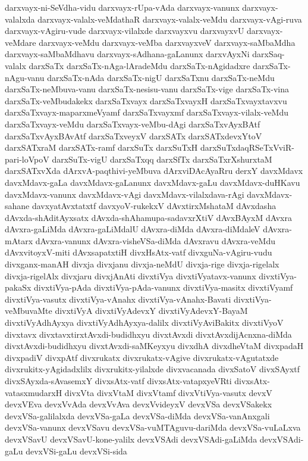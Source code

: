 {darxvayx-ni-SeVdha-vidu
darxvayx-rUpa-vAda
darxvayx-vanunx
darxvayx-valalxda
darxvayx-valalx-veMdathaR
darxvayx-valalx-veMdu
darxvayx-vAgi-ruva
darxvayx-vAgiru-vude
darxvayx-vilalxde
darxvayxvu
darxvayxvU
darxvayx-veMdare
darxvayx-veMdu
darxvayx-veMba
darxvayxveV
darxvayx-saMbaMdha
darxvayx-saMbaMdhavu
darxvayx-sAdhana-gaLanunx
darxvAyxNi
darxSaq-valalx
darxSaTx
darxSaTx-nAga-lAradeMdu
darxSaTx-nAgidadxre
darxSaTx-nAgu-vanu
darxSaTx-nAda
darxSaTx-nigU
darxSaTxnu
darxSaTx-neMdu
darxSaTx-neMbuva-vanu
darxSaTx-nesisu-vanu
darxSaTx-vige
darxSaTx-vina
darxSaTx-veMbudakekx
darxSaTxvayx
darxSaTxvayxH
darxSaTxvayxtavxvu
darxSaTxvayx-maparxmeVyamf
darxSaTxvayxmf
darxSaTxvayx-vilalx-veMdu
darxSaTxvayx-veMdu
darxSaTxvayx-veMbu-dAgi
darxSaTxvAyxBAtf
darxSaTxvAyxBAvAtf
darxSaTxveyxV
darxSATx
darxSATxdevxYtoV
darxSATxraM
darxSATx-ramf
darxSuTx
darxSuTxH
darxSuTxdaqRSeTxVviR-pari-loVpoV
darxSuTx-vigU
darxSaTxqq
darxSfTx
darxSaTxrXshurxtaM
darxSATxvXda
dArxvA-paqthivi-yeMbuva
dArxviDAcAyaRru
derxY
davxMdavx
davxMdavx-gaLa
davxMdavx-gaLanunx
davxMdavx-gaLu
davxMdavx-duHKavu
davxMdavx-vanunx
davxMdavx-vAgi
davxMdavx-vilalxdava-rAgi
davxMdavx-sahane
davxyatAvxtatxtf
davxyoV-rukekxV
dAvxtirxMshataM
dAvxdasha
dAvxda-shAditAyxsatx
dAvxda-shAhamupa-sadavxrXtiV
dAvxBAyxM
dAvxra
dAvxra-gaLiMda
dAvxra-gaLiMdalU
dAvxra-diMda
dAvxra-diMdaleV
dAvxra-mAtarx
dAvxra-vanunx
dAvxra-visheVSa-diMda
dAvxravu
dAvxra-veMdu
dAvxvitoyxV-miti
dAvxsapatxtiH
divxHsAtx-vatf
divxguNa-vAgiru-vudu
divxganx-manAH
divxja
divxjanu
divxja-neMdU
divxja-rige
divxja-rigelalx
divxja-rigelAlx
divxjaru
divxjAnAti
divxtiVya
divxtiVyatavx-vanunx
divxtiVya-pakaSx
divxtiVya-pAda
divxtiVya-pAda-vanunx
divxtiVya-masitx
divxtiVyamf
divxtiVya-vasutx
divxtiVya-vAnahx
divxtiVya-vAnahx-Bavati
divxtiVya-veMbuvaMte
divxtiVyA
divxtiVyAdevxY
divxtiVyAdevxY-BayaM
divxtiVyAdhAyxya
divxtiVyAdhAyxya-dalilx
divxtiVyAviBakitx
divxtiVyoV
divxtavx
divxtavxtirxtAvxdi-budidhxyu
divxtAvxdi
divxtAvxdijAcnxna-diMda
divxtAvxdi-budidhxyu
divxtAvxdi-saMKeyxyu
divxdhA
divxdheVtaM
divxpadaH
divxpadiV
divxpAtf
divxrukatx
divxrukatx-vAgive
divxrukatx-vAgutatxde
divxrukitx-yAgidadxlilx
divxrukitx-yilalxde
divxvacanada
divxSatoV
divxSAyxtf
divxSAyxda-sAvasemxY
divxsAtx-vatf
divxsAtx-vatapxyeVRti
divxsAtx-vatasxmudarxH
divxVta
divxVtaM
divxVtamf
divxVtiVya-vasutx
devxV
devxVEva
devxVvAda
devxVvAva
devxVvideyxV
devxVSa
devxVSakekx
devxVSa-galilalxda
devxVSa-gaLa
devxVSa-diMda
devxVSa-vanAnxgali
devxVSa-vanunx
devxVSavu
devxVSa-vuMTAguvu-dariMda
devxVSa-vuLaLxva
devxVSavU
devxVSavU-kone-yalilx
devxVSAdi
devxVSAdi-gaLiMda
devxVSAdi-gaLu
devxVSi-gaLu
devxVSi-sida
}
